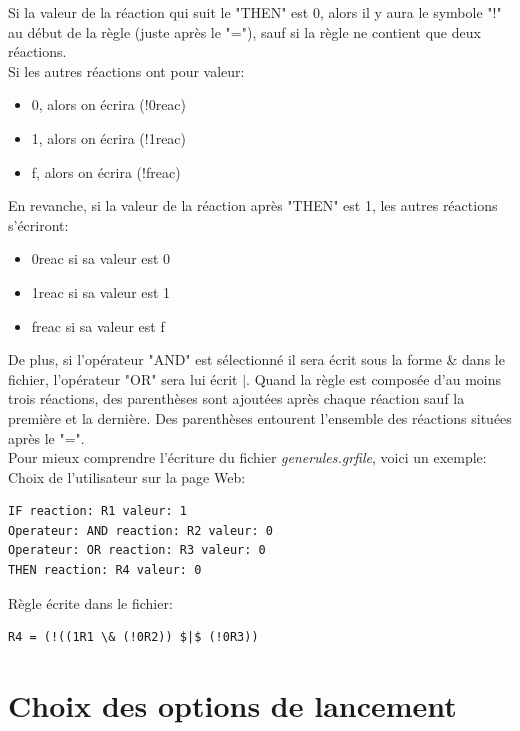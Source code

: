 Si la valeur de la réaction qui suit le "THEN" est 0, alors il y aura le symbole "!" au début de la règle (juste après le "="), sauf si la règle ne contient que deux réactions.\\
Si les autres réactions ont pour valeur:
\begin{itemize}
\item 0, alors on écrira (!0reac)
\item 1, alors on écrira (!1reac)
\item f, alors on écrira (!freac)
\end{itemize}
En revanche, si la valeur de la réaction après "THEN" est 1, les autres réactions s'écriront:
\begin{itemize}
\item 0reac si sa valeur est 0
\item 1reac si sa valeur est 1
\item freac si sa valeur est f
\end{itemize}
De plus, si l'opérateur "AND" est sélectionné il sera écrit sous la forme \& dans le fichier, l'opérateur "OR" sera lui écrit $|$. Quand la règle est composée d'au moins trois réactions, des parenthèses sont ajoutées après chaque réaction sauf la première et la dernière. Des parenthèses entourent l'ensemble des réactions situées après le "=".\\

Pour mieux comprendre l'écriture du fichier \emph{generules.grfile}, voici un exemple:\\

Choix de l'utilisateur sur la page Web: \\
\begin{DDbox}{\linewidth}
\begin{lstlisting}
IF reaction: R1 valeur: 1
Operateur: AND reaction: R2 valeur: 0
Operateur: OR reaction: R3 valeur: 0
THEN reaction: R4 valeur: 0
\end{lstlisting}
\end{DDbox}

Règle écrite dans le fichier: \\
\begin{DDbox}{\linewidth}
\begin{lstlisting}
R4 = (!((1R1 \& (!0R2)) $|$ (!0R3))
\end{lstlisting}
\end{DDbox}


\section{Choix des options de lancement}

